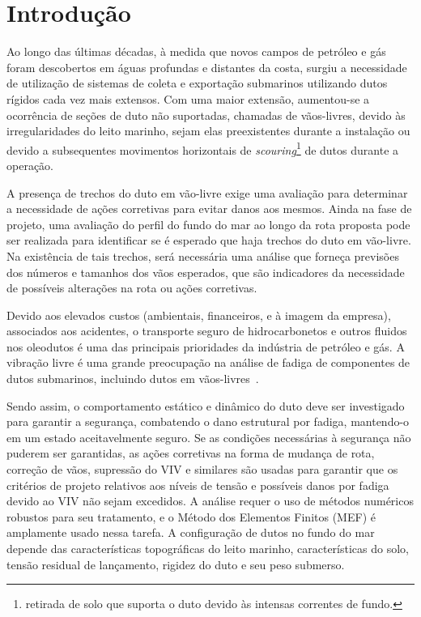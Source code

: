 \chapter{Introdução}


Ao longo das últimas décadas, à medida que novos campos de petróleo e gás foram descobertos em águas profundas e distantes da costa, surgiu a necessidade de utilização de sistemas de coleta e exportação submarinos utilizando dutos rígidos cada vez mais extensos.
Com uma maior extensão, aumentou-se a ocorrência de seções de duto não suportadas, chamadas de vãos-livres, devido às irregularidades do leito marinho, sejam elas preexistentes durante a instalação ou devido a subsequentes movimentos horizontais de \textit{scouring}\footnote{retirada de solo que suporta o duto devido às intensas correntes de fundo.} de dutos durante a operação.

A presença de trechos do duto em vão-livre exige uma avaliação para determinar a necessidade de ações corretivas para evitar danos aos mesmos.
Ainda na fase de projeto, uma avaliação do perfil do fundo do mar ao longo da rota proposta pode ser realizada para identificar se é esperado que haja trechos do duto em vão-livre.
Na existência de tais trechos, será necessária uma análise que forneça previsões dos números e tamanhos dos vãos esperados, que são indicadores da necessidade de possíveis alterações na rota ou ações corretivas.

Devido aos elevados custos (ambientais, financeiros, e à imagem da empresa), associados aos acidentes, o transporte seguro de hidrocarbonetos e outros fluidos nos oleodutos é uma das principais prioridades da indústria de petróleo e gás.
A vibração livre é uma grande preocupação na análise de fadiga de componentes de dutos submarinos, incluindo dutos em vãos-livres~\cite{Gamino2013}.

Sendo assim, o comportamento estático e dinâmico do duto deve ser investigado para garantir a segurança, combatendo o dano estrutural por fadiga, mantendo-o em um estado aceitavelmente seguro.
Se as condições necessárias à segurança não puderem ser garantidas, as ações corretivas na forma de mudança de rota, correção de vãos, supressão do VIV e similares são usadas para garantir que os critérios de projeto relativos aos níveis de tensão e possíveis danos por fadiga devido ao VIV não sejam excedidos.
A análise requer o uso de métodos numéricos robustos para seu tratamento, e o Método dos Elementos Finitos (MEF) é amplamente usado nessa tarefa.
A configuração de dutos no fundo do mar depende das características topográficas do leito marinho, características do solo, tensão residual de lançamento, rigidez do duto e seu peso submerso.

